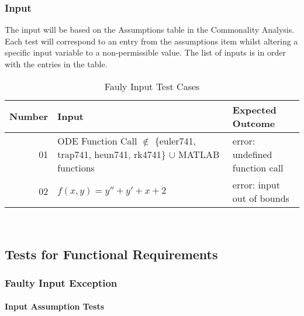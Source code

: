 \documentclass[12pt, titlepage]{article}
\begin{document}
\subsubsection{Input}
		
The input will be based on the Assumptions table in the Commonality Analysis. Each test will correspond to an entry from the assumptions item whilst altering a specific input variable to a non-permissible value. The list of inputs is in order with the entries in the table.

\begin{table} [H]
  \caption{Fauly Input Test Cases}
  \label{Table:Table_FaultyInputs}  
\begin{tabular}{|r|p{8cm}|p{6cm}|}
  \hline	
  \textbf{Number} & \textbf{Input} &\textbf{Expected Outcome}\\
  \hline 
  01 & ODE Function Call $\mathbb{\notin}$ \{euler741, trap741, heun741, rk4741\} $\mathbb{\cup}$ 
  MATLAB functions & error: undefined function call\\ \hline
  
  02& $f(x, y) = y'' + y' + x + 2$ & error: input out of bounds\\
  
  
  \hline
\end{tabular}\\

\end{table}


\subsection{Tests for Functional Requirements}

\subsubsection{Faulty Input Exception}
		
\paragraph{Input Assumption Tests}
\end{document}
